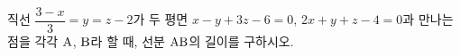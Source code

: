 직선 $\dfrac{3-x}{3}=y=z-2$가 두 평면 $x-y+3z-6=0$, $2x+y+z-4=0$과 만나는 점을 각각 $\mathrm{A}$, $\mathrm{B}$라 할 때, 선분 $\mathrm{AB}$의 길이를 구하시오.
